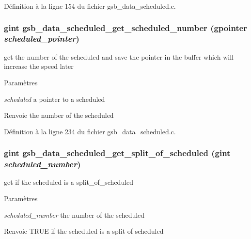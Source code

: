 Définition à la ligne 154 du fichier gsb\_\-data\_\-scheduled.c.

\subsubsection[{gsb\_\-data\_\-scheduled\_\-get\_\-scheduled\_\-number}]{\setlength{\rightskip}{0pt plus 5cm}gint gsb\_\-data\_\-scheduled\_\-get\_\-scheduled\_\-number (gpointer {\em scheduled\_\-pointer})}\label{gsb__data__scheduled_8h_ab2a72c93ed6dcf08a477aea4e069c5e3}
get the number of the scheduled and save the pointer in the buffer which will increase the speed later


\begin{DoxyParams}{Paramètres}
\item[{\em scheduled}]a pointer to a scheduled\end{DoxyParams}
\begin{DoxyReturn}{Renvoie}
the number of the scheduled 
\end{DoxyReturn}


Définition à la ligne 234 du fichier gsb\_\-data\_\-scheduled.c.

\subsubsection[{gsb\_\-data\_\-scheduled\_\-get\_\-split\_\-of\_\-scheduled}]{\setlength{\rightskip}{0pt plus 5cm}gint gsb\_\-data\_\-scheduled\_\-get\_\-split\_\-of\_\-scheduled (gint {\em scheduled\_\-number})}\label{gsb__data__scheduled_8h_ae2bbf34058b508781bd4af1292b64d6a}
get if the scheduled is a split\_\-of\_\-scheduled


\begin{DoxyParams}{Paramètres}
\item[{\em scheduled\_\-number}]the number of the scheduled\end{DoxyParams}
\begin{DoxyReturn}{Renvoie}
TRUE if the scheduled is a split of scheduled 
\end{DoxyReturn}



